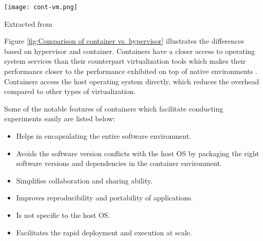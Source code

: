 \begin{center}
\texttt{[image: cont-vm.png]}
\label{fig:Comparison of container vs. hypervisor}
\caption*{Extracted from \cite{7382987}}
\end{center}

Figure \ref{fig:Comparison of container vs. hypervisor} illustrates
the differences based on hypervisor and container. Containers have a
closer access to operating system services than their counterpart
virtualization tools which makes their performance closer to the
performance exhibited on top of native environments
\cite{Xavier:2013:PEC:2497369.2497577}. Containers access the host
operating system directly, which reduces the overhead compared to
other types of virtualization. 

Some of the notable features of containers \cite{docker-run} \cite{DBLP:journals/corr/HaleLRW16} \cite{Julian:2016:CRI:2949550.2949562} \cite{10.1109/ISPASS.2015.7095802} which facilitate conducting experiments easily are listed below:

\begin{itemize}
  \item Helps in encapsulating the entire software environment.
  \item Avoids the software version conflicts with the host OS by packaging the right software versions and dependencies in the container environment.
  \item Simplifies collaboration and sharing ability.
  \item Improves reproducibility and portability of applications.
  \item Is not specific to the host OS. 
  \item Facilitates the rapid deployment and execution at scale.
\end{itemize}


